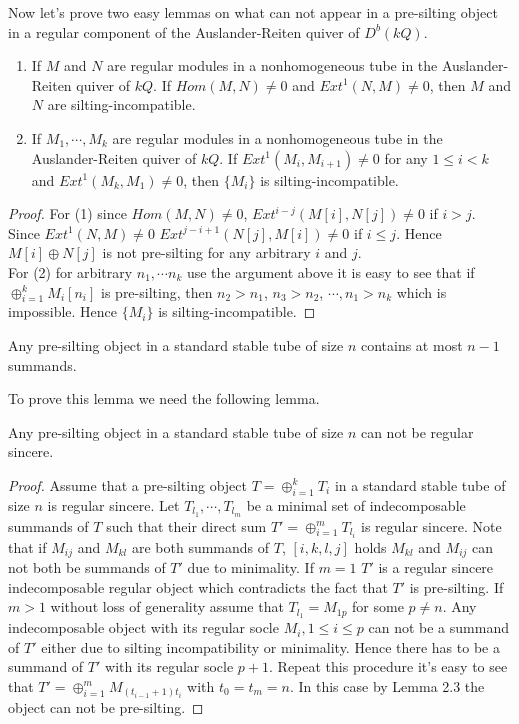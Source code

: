 \indent Now let's prove two easy lemmas on what can not appear in a pre-silting object in a regular component of the Auslander-Reiten quiver of $D^b(kQ)$.\\
\begin{lemma}
\begin{enumerate}
\item If $M$ and $N$ are regular modules in a nonhomogeneous tube in the Auslander-Reiten quiver of $kQ$. If $Hom(M,N)\neq 0$ and $Ext^1(N,M)\neq 0$, then $M$ and $N$ are silting-incompatible.\\
\item If $M_1,\cdots, M_k$ are regular modules in a nonhomogeneous tube in the Auslander-Reiten quiver of $kQ$. If $Ext^1(M_i,M_{i+1})\neq 0$ for any $1\leq i<k$  and $Ext^1(M_k,M_1)\neq 0$, then $\{M_i\}$  is silting-incompatible.\\
\end{enumerate}
\end{lemma}
\begin{proof}
\indent For (1) since $Hom(M,N)\neq 0$, $Ext^{i-j}(M[i],N[j])\neq 0$ if $i>j$. Since $Ext^1(N,M)\neq 0$ $Ext^{j-i+1}(N[j],M[i])\neq 0$ if $i\leq j$. Hence $M[i]\oplus N[j]$ is not pre-silting for any arbitrary $i$ and $j$.\\
\indent For (2) for arbitrary $n_1,\cdots n_k$ use the argument above it is easy to see that if $\oplus_{i=1}^kM_i[n_i]$ is pre-silting, then $n_2>n_1$, $n_3>n_2$, $\cdots, n_1>n_k$ which is impossible. Hence $\{M_i\}$  is silting-incompatible.
\end{proof}
\begin{lemma}\label{def:C3L3}
Any pre-silting object in a standard stable tube of size $n$ contains at most $n-1$ summands.
\end{lemma}
\indent To prove this lemma we need the following lemma.
\begin{lemma}
Any pre-silting object in a standard stable tube of size $n$ can not be regular sincere.
\end{lemma}
\begin{proof}
\indent Assume that a pre-silting object $T=\oplus_{i=1}^k T_i$ in a standard stable tube of size $n$ is regular sincere. Let $T_{l_1},\cdots, T_{l_m}$ be a minimal set of indecomposable summands of $T$ such that their direct sum $T'=\oplus_{i=1}^m T_{l_i}$ is regular sincere. Note that if $M_{ij}$ and $M_{kl}$ are both summands of $T$, $[i,k,l,j]$ holds $M_{kl}$ and $M_{ij}$ can not both be summands of $T'$ due to minimality. If $m=1$ $T'$ is a regular sincere indecomposable regular object which contradicts the fact that $T'$ is pre-silting. If $m>1$ without loss of generality assume that $T_{l_1}=M_{1p}$ for some $p\neq n$. Any indecomposable object with its regular socle $M_i, 1\leq i\leq p$ can not be a summand of $T'$ either due to silting incompatibility or minimality. Hence there has to be a summand of $T'$ with its regular socle $p+1$. Repeat this procedure it's easy to see that $T'=\oplus_{i=1}^m M_{(t_{i-1}+1)t_i}$ with $t_0=t_m=n$. In this case by Lemma 2.3 the object can not be pre-silting.
\end{proof}
